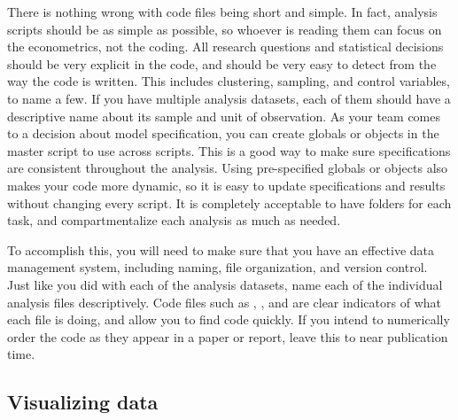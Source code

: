 There is nothing wrong with code files being short and simple.
In fact, analysis scripts should be as simple as possible,
so whoever is reading them can focus on the econometrics, not the coding.
All research questions and statistical decisions should be very explicit in the code,
and should be very easy to detect from the way the code is written.
This includes clustering, sampling, and control variables, to name a few.
If you have multiple analysis datasets,
each of them should have a descriptive name about its sample and unit of observation.
As your team comes to a decision about model specification,
you can create globals or objects in the master script to use across scripts.
This is a good way to make sure specifications are consistent throughout the analysis.
Using pre-specified globals or objects also makes your code more dynamic,
so it is easy to update specifications and results without changing every script.
It is completely acceptable to have folders for each task,
and compartmentalize each analysis as much as needed.

To accomplish this, you will need to make sure that you have an effective data management system,
including naming, file organization, and version control.
Just like you did with each of the analysis datasets,
name each of the individual analysis files descriptively.
Code files such as ,
, and 
are clear indicators of what each file is doing, and allow you to find code quickly.
If you intend to numerically order the code as they appear in a paper or report,
leave this to near publication time.

\subsection{Visualizing data}

